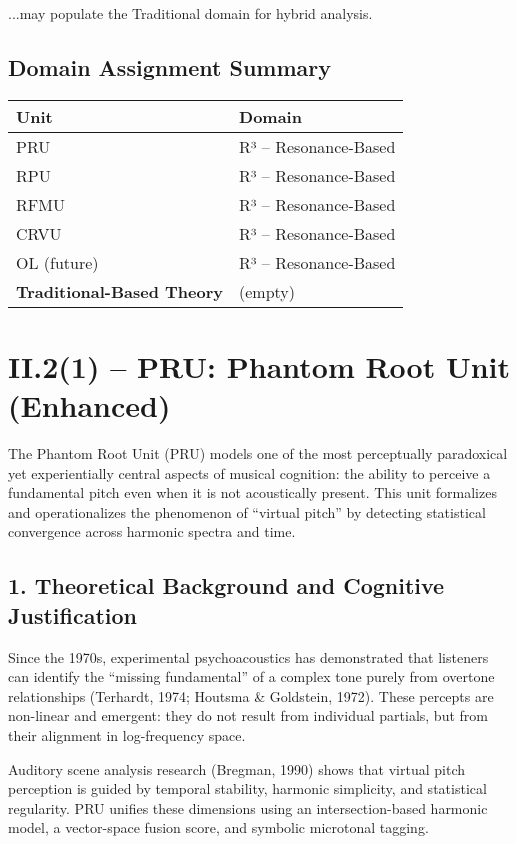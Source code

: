 \documentclass{article}
\begin{document}
...may populate the Traditional domain for hybrid analysis.

\subsection*{Domain Assignment Summary}

\begin{center}
\begin{tabular}{|l|l|}
\hline
\textbf{Unit} & \textbf{Domain} \\
\hline
PRU & R³ – Resonance-Based \\
RPU & R³ – Resonance-Based \\
RFMU & R³ – Resonance-Based \\
CRVU & R³ – Resonance-Based \\
OL (future) & R³ – Resonance-Based \\
\hline
\textbf{Traditional-Based Theory} & (empty) \\
\hline
\end{tabular}
\end{center}

\section*{II.2(1) – PRU: Phantom Root Unit (Enhanced)}

The Phantom Root Unit (PRU) models one of the most perceptually paradoxical yet experientially central aspects of musical cognition: the ability to perceive a fundamental pitch even when it is not acoustically present. This unit formalizes and operationalizes the phenomenon of “virtual pitch” by detecting statistical convergence across harmonic spectra and time.

\subsection*{1. Theoretical Background and Cognitive Justification}

Since the 1970s, experimental psychoacoustics has demonstrated that listeners can identify the “missing fundamental” of a complex tone purely from overtone relationships (Terhardt, 1974; Houtsma \& Goldstein, 1972). These percepts are non-linear and emergent: they do not result from individual partials, but from their alignment in log-frequency space.

Auditory scene analysis research (Bregman, 1990) shows that virtual pitch perception is guided by temporal stability, harmonic simplicity, and statistical regularity. PRU unifies these dimensions using an intersection-based harmonic model, a vector-space fusion score, and symbolic microtonal tagging.
\end{document}
